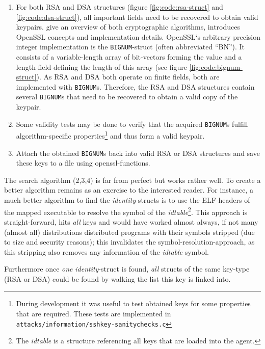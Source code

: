 \begin{enumerate}
	\item For both RSA and DSA structures (figure \ref{fig:code:rsa-struct}
		and \ref{fig:code:dsa-struct}), all important fields need to be
		recovered to obtain valid keypairs.  \cite{applied_crypto:1996,
		handbook_applied_crypto:2001} give an overview of both
		cryptographic algorithms, \cite{openssl_book:2002} introduces
		OpenSSL concepts and implementation details. OpenSSL`s arbitrary
		precision integer implementation is the \texttt{BIGNUM}-struct
		(often abbreviated ``BN'').  It consists of a variable-length
		array of bit-vectors forming the value and a length-field
		defining the length of this array (see figure
		\ref{fig:code:bignum-struct}).  As RSA and DSA both operate on
		finite fields, both are implemented with \texttt{BIGNUM}s.
		Therefore, the RSA and DSA structures contain several
		\texttt{BIGNUM}s that need to be recovered to obtain a valid
		copy of the keypair.

	\item Some validity tests may be done to verify that the acquired
		\texttt{BIGNUM}s fulfill algorithm-specific
		properties\footnote{During development it was useful to test
		obtained keys for some properties that are required. These tests
		are implemented in
		\texttt{attacks/information/sshkey-sanitychecks.c}} and thus
		form a valid keypair.

	\item Attach the obtained \texttt{BIGNUM}s back into valid RSA or DSA
		structures and save these keys to a file using
		openssl-functions.
	
\end{enumerate}
	
The search algorithm (2,3,4) is far from perfect but works rather well.  To
create a better algorithm remains as an exercise to the interested reader. For
instance, a much better algorithm to find the \emph{identity}-structs is to use
the ELF-headers of the mapped executable to resolve the symbol of the
\emph{idtable}\footnote{The \emph{idtable} is a structure referencing all keys
that are loaded into the agent.}. This approach is straight-forward, hits
\emph{all} keys and would have worked almost always, if not many (almost all)
distributions distributed programs with their symbols stripped (due to size and
security reasons); this invalidates the symbol-resolution-approach, as this
stripping also removes any information of the \emph{idtable} symbol.

Furthermore once \emph{one} \emph{identity}-struct is found, \emph{all} structs
of the same key-type (RSA or DSA) could be found by walking the list this key is
linked into.

